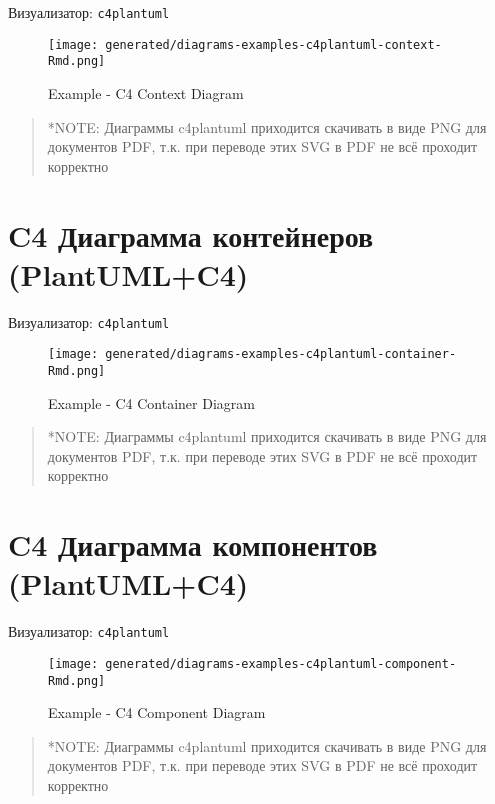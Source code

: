 \documentclass[12pt,a4paper,12pt,oneside,openany]{book}
\begin{document}
Визуализатор: \texttt{c4plantuml}

\begin{figure}
\centering
\texttt{[image: generated/diagrams-examples-c4plantuml-context-Rmd.png]}
\caption{Example - C4 Context Diagram}
\end{figure}

\begin{quote}
*NOTE: Диаграммы c4plantuml приходится скачивать в виде PNG для документов PDF, т.к. при переводе этих SVG в PDF не всё проходит корректно
\end{quote}

\newpage

\section{C4 Диаграмма контейнеров (PlantUML+C4)}\label{c4---plantumlc4}

Визуализатор: \texttt{c4plantuml}

\begin{figure}
\centering
\texttt{[image: generated/diagrams-examples-c4plantuml-container-Rmd.png]}
\caption{Example - C4 Container Diagram}
\end{figure}

\begin{quote}
*NOTE: Диаграммы c4plantuml приходится скачивать в виде PNG для документов PDF, т.к. при переводе этих SVG в PDF не всё проходит корректно
\end{quote}

\newpage

\section{C4 Диаграмма компонентов (PlantUML+C4)}\label{c4---plantumlc4}

Визуализатор: \texttt{c4plantuml}

\begin{figure}
\centering
\texttt{[image: generated/diagrams-examples-c4plantuml-component-Rmd.png]}
\caption{Example - C4 Component Diagram}
\end{figure}

\begin{quote}
*NOTE: Диаграммы c4plantuml приходится скачивать в виде PNG для документов PDF, т.к. при переводе этих SVG в PDF не всё проходит корректно
\end{quote}
\end{document}
